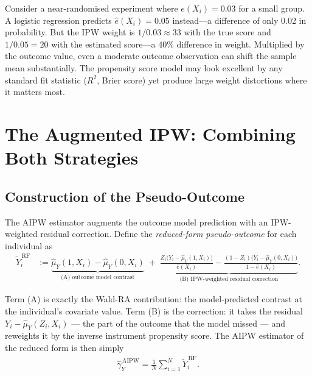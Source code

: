 \documentclass[12pt,a4paper]{article}
\theoremstyle{remark}
\newcommand{\muYhat}{\hat{\mu}_Y}
\newcommand{\ehat}{\hat{e}}
\newcommand{\YRF}{\widetilde{Y}^{\,\mathrm{RF}}}
\newenvironment{intuition}[1]{%
  \begin{tcolorbox}[
    enhanced,
    colback=remarkbg,
    colframe=remarkframe,
    arc=3pt,
    boxrule=0.6pt,
    left=8pt, right=8pt, top=6pt, bottom=6pt,
    title={\small\textit{Intuition: #1}},
    fonttitle=\bfseries\small,
    coltitle=black
  ]
  \small
}{%
  \end{tcolorbox}
}
\begin{document}
\begin{intuition}{Why wrong propensity scores are hard to detect}
Consider a near-randomised experiment where $e(X_i) = 0.03$ for a small group.
A logistic regression predicts $\ehat(X_i) = 0.05$ instead---a difference of only
0.02 in probability. But the IPW weight is $1/0.03 \approx 33$ with the true score
and $1/0.05 = 20$ with the estimated score---a 40\% difference in weight. Multiplied
by the outcome value, even a moderate outcome observation can shift the sample mean
substantially. The propensity score model may look excellent by any standard fit
statistic ($R^2$, Brier score) yet produce large weight distortions where it matters most.
\end{intuition}

\section{The Augmented IPW: Combining Both Strategies}
\label{sec:aipw}

\subsection{Construction of the Pseudo-Outcome}
\label{subsec:pseudo}

The AIPW estimator \citep{tan2006distributional} augments the outcome model prediction
with an IPW-weighted residual correction. Define the \emph{reduced-form pseudo-outcome}
for each individual as
\begin{align}
  \YRF_i
  &:=
  \underbrace{
    \muYhat(1, X_i) - \muYhat(0, X_i)
  }_{\text{(A) outcome model contrast}}
  \;+\;
  \underbrace{
    \frac{Z_i\bigl(Y_i - \muYhat(1, X_i)\bigr)}{\ehat(X_i)}
    -
    \frac{(1-Z_i)\bigl(Y_i - \muYhat(0, X_i)\bigr)}{1 - \ehat(X_i)}
  }_{\text{(B) IPW-weighted residual correction}}.
  \label{eq:rf_pseudo_main}
\end{align}

Term (A) is exactly the Wald-RA contribution: the model-predicted contrast at the
individual's covariate value. Term (B) is the correction: it takes the residual
$Y_i - \muYhat(Z_i, X_i)$ --- the part of the outcome that the model missed ---
and reweights it by the inverse instrument propensity score. The AIPW estimator
of the reduced form is then simply
\begin{align}
  \hat{\gamma}_Y^{\,\mathrm{AIPW}}
  = \frac{1}{N}\sum_{i=1}^{N} \YRF_i.
  \label{eq:aipw_estimator}
\end{align}
\end{document}
